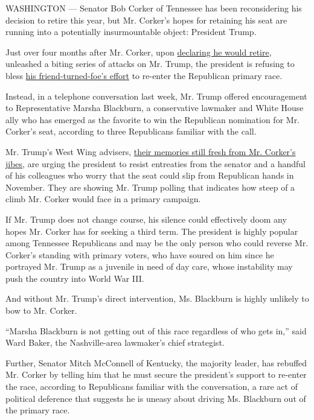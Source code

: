 WASHINGTON --- Senator Bob Corker of Tennessee has been reconsidering
his decision to retire this year, but Mr. Corker's hopes for retaining
his seat are running into a potentially insurmountable object: President
Trump.

Just over four months after Mr. Corker, upon
\href{https://www.nytimes3xbfgragh.onion/2017/09/26/us/politics/tennessees-bob-corker-announces-retirement-from-senate.html}{declaring
he would retire}, unleashed a biting series of attacks on Mr. Trump, the
president is refusing to bless
\href{https://www.nytimes3xbfgragh.onion/2017/10/24/us/politics/trump-corker-feud-dog-catcher.html}{his
friend-turned-foe's effort} to re-enter the Republican primary race.

Instead, in a telephone conversation last week, Mr. Trump offered
encouragement to Representative Marsha Blackburn, a conservative
lawmaker and White House ally who has emerged as the favorite to win the
Republican nomination for Mr. Corker's seat, according to three
Republicans familiar with the call.

Mr. Trump's West Wing advisers,
\href{https://www.nytimes3xbfgragh.onion/2017/10/08/us/politics/trump-corker.html}{their
memories still fresh from Mr. Corker's jibes}, are urging the president
to resist entreaties from the senator and a handful of his colleagues
who worry that the seat could slip from Republican hands in November.
They are showing Mr. Trump polling that indicates how steep of a climb
Mr. Corker would face in a primary campaign.

If Mr. Trump does not change course, his silence could effectively doom
any hopes Mr. Corker has for seeking a third term. The president is
highly popular among Tennessee Republicans and may be the only person
who could reverse Mr. Corker's standing with primary voters, who have
soured on him since he portrayed Mr. Trump as a juvenile in need of day
care, whose instability may push the country into World War III.

And without Mr. Trump's direct intervention, Ms. Blackburn is highly
unlikely to bow to Mr. Corker.

``Marsha Blackburn is not getting out of this race regardless of who
gets in,'' said Ward Baker, the Nashville-area lawmaker's chief
strategist.

Further, Senator Mitch McConnell of Kentucky, the majority leader, has
rebuffed Mr. Corker by telling him that he must secure the president's
support to re-enter the race, according to Republicans familiar with the
conversation, a rare act of political deference that suggests he is
uneasy about driving Ms. Blackburn out of the primary race.

